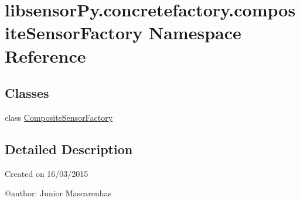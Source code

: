 \hypertarget{namespacelibsensorPy_1_1concretefactory_1_1compositeSensorFactory}{}\section{libsensor\+Py.\+concretefactory.\+composite\+Sensor\+Factory Namespace Reference}
\label{namespacelibsensorPy_1_1concretefactory_1_1compositeSensorFactory}
\subsection*{Classes}
\begin{DoxyCompactItemize}
\item 
class \hyperlink{classlibsensorPy_1_1concretefactory_1_1compositeSensorFactory_1_1CompositeSensorFactory}{Composite\+Sensor\+Factory}
\end{DoxyCompactItemize}


\subsection{Detailed Description}
\begin{DoxyVerb}Created on 16/03/2015

@author: Junior Mascarenhas
\end{DoxyVerb}
 